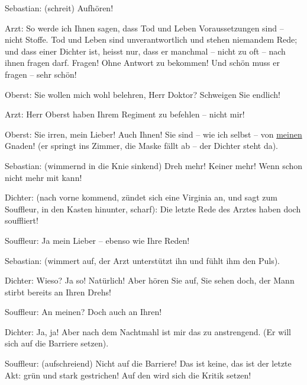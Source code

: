 \pstart
           Sebastian: (schreit) Aufhören!\pend
           
\pstart
           Arzt: So werde ich Ihnen sagen, dass Tod und Leben Voraussetzungen sind – nicht
               Stoffe. Tod und Leben sind unverantwortlich und stehen niemandem Rede; und dass einer
               Dichter ist, heisst nur, dass er manchmal – nicht zu oft – nach ihnen fragen darf.
               Fragen! Ohne Antwort zu bekommen! Und schön muss er fragen – sehr schön!\pend
           
\pstart
           Oberst: Sie wollen mich wohl belehren, Herr Doktor? Schweigen Sie endlich!\pend
           
\pstart
           Arzt: Herr Oberst haben Ihrem Regiment zu befehlen – nicht mir!\pend
           
\pstart
           Oberst: Sie irren, mein Lieber! Auch Ihnen! Sie sind – wie ich selbst – von \uline{meinen} Gnaden! (er springt ins Zimmer, die Maske fällt
               ab – der Dichter steht da).\pend
           
\pstart
           Sebastian: (wimmernd in die Knie sinkend)  Dreh mehr!
               Keiner mehr! Wenn  schon nicht mehr mit kann!\pend
           
\pstart
           Dichter: (nach vorne kommend, zündet sich eine Virginia an, und sagt zum Souffleur,
               in den Kasten hinunter, scharf): {\pb}Die letzte Rede des Arztes haben doch 
               souffliert!\pend
           
\pstart
           Souffleur: Ja mein Lieber – ebenso wie Ihre Reden!\pend
           
\pstart
           Sebastian: (wimmert auf, der Arzt unterstützt ihn und fühlt ihm den Puls).\pend
           
\pstart
           Dichter: Wieso? Ja so! Natürlich! Aber hören Sie auf, Sie sehen doch, der Mann stirbt
               bereits an Ihren Drehs!\pend
           
\pstart
           Souffleur: An meinen? Doch auch an Ihren!\pend
           
\pstart
           Dichter: Ja, ja! Aber nach dem Nachtmahl ist mir das zu anstrengend. (Er will sich
               auf die Barriere setzen).\pend
           
\pstart
           Souffleur: (aufschreiend) Nicht auf die Barriere! Das ist keine, das ist der letzte
               Akt: grün und stark gestrichen! Auf den wird sich die Kritik setzen!\pend
           
